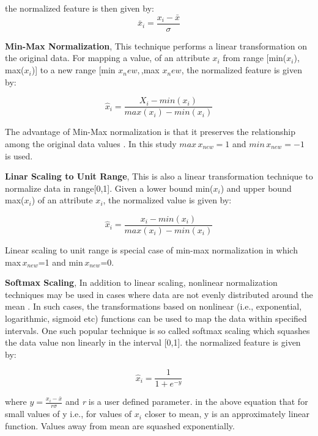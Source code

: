 the normalized feature is then given by:
\begin{equation}
\bar{x}_i=\frac{x_i-\bar{x}}{\sigma}
\end{equation}

\textbf{Min-Max Normalization}, This technique performs a linear transformation on the original data. For mapping a value, of an attribute \(x_i\) from range [min(\(x_i\)), max(\(x_i\))] to a new range [min \(x_new,\),max \(x_new\), the normalized feature is given by:

\begin{equation}
\hat{x}_i=\frac{X_i-min(x_i)}{max(x_i)-min(x_i)}
\end{equation}

The advantage of Min-Max normalization is that it preserves the relationship among the original data values \cite{manikandan2013achieving}. In this study \(max\,x_{new}=1\) and \(min\,x_{new}=-1\) is used.

\textbf{Linar Scaling to Unit Range}, This is also a linear transformation technique to normalize data in range[0,1]. Given a lower bound min(\(x_i\)) and upper bound max(\(x_i\)) of an attribute \(x_i\), the normalized value is given by:

\begin{equation}
\hat{x}_i=\frac{x_i-min(x_i)}{max(x_i)-min(x_i)}
\end{equation}

Linear scaling to unit range is special case of min-max normalization in which max\(\,x_{new}\)=1 and min\(\,x_{new}\)=0.

\textbf{Softmax Scaling}, In addition to linear scaling, nonlinear normalization techniques may be used in cases where data are not evenly distributed around the mean \cite{theodoridis2010introduction}. In such cases, the transformations based on nonlinear (i.e., exponential, logarithmic, sigmoid etc) functions can be used to map the data within specified intervals. One such popular technique is so called softmax scaling which squashes the data value non linearly in the interval [0,1]. the normalized feature is given by:

\begin{equation}
\hat{x}_i=\frac{1}{1+e^{-y}}
\end{equation}

where \(y=\frac{x_i-\bar{x}}{r\sigma}\) and \textit{r} is a user defined parameter. in the above equation that for small values of y i.e., for values of \(x_i\) closer to mean, y is an approximately linear function. Values away from mean are squashed exponentially.